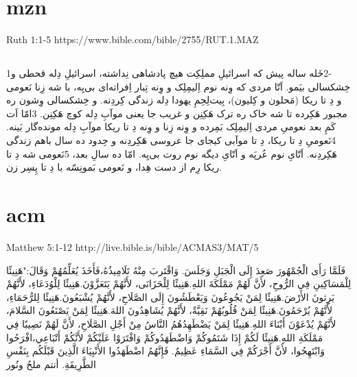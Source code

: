 \documentclass[12pt,fleqn,titlepage,twoside,a4paper]{book}
\begin{document}
\section{mzn}

Ruth 1:1-5  https://www.bible.com/bible/2755/RUT.1.MAZ

\begin{arab}[utf]
\section*{}

1‏-2خَله ساله پیش که اسرائیلِ مملِکِت هیچ پادشاهی نِداشته، اسرائیلِ دِله قحطی و خِشکسالی بیَمو. اَتّا مردی که وِنه نوم اِلیمِلِک و وِنه تِبار اِفراته‌ای بی‌یِه، با شه زِنا نَعومی و دِ تا ریکا (مَحلون و کِلیون)، بِیت‌لِحِمِ یهودا دِله زندگی کِردِنه. و خِشکسالی وِشون ره مجبور هَکِرده تا شه خاک ره ترک هَکِنِن و غریب جا یعنی موآبِ دِله کوچ هَکِنِن. 3امّا اَت کَمِ بعد نعومیِ مردی اِلیمِلِک بَمِرده و وِنه زِنا و وِنه دِ تا ریکا موآبِ دِله مونده‌گار بَینه. 4نَعومیِ دِ تا ریکا، دِ تا موآبی کیجای جا عروسی هَکِردِنه و حِدود ده سال باهم زندگی هَکِردِنه. اَتّایِ نوم عُرپَه و اَتّایِ دیگه نوم روت بی‌یِه. امّا ده سالِ بعد، 5نَعومی شه دِ تا ریکا رِم از دست هِدا، و نَعومی بَمونِسّه با دِ تا پِسِر زن.

\end{arab}


\section{acm}

Matthew 5:1-12 http://live.bible.is/bible/ACMAS3/MAT/5

\begin{arab}[utf]

فَلَمَّا رَأَى الْجُمْهُورَ صَعِدَ إِلَى الْجَبَلِ وَجَلَسَ. وَاقْتَربَ مِنْهُ تَلَامِيذُهُ،فَأَخَذَ يُعَلِّمُهُمْ وَقَالَ:"هَنِيئًا لِلْمَسَاكِينِ فِي الرُّوحِ، لأَنَّ لَهُمْ مَمْلَكَةَ اللهِ.هَنِيئًا لِلْحَزَانَى، لأَنَّهُمْ يَتَعَزَّوْنَ.هَنِيئًا لِلْوُدَعَاءِ، لأَنَّهُمْ يَرِثونَ الأَرْضَ.هَنِيئًا لِمَنْ يَجُوعُونَ وَيَعْطَشُونَ إِلَى الصَّلَاحِ، لأَنَّهُمْ يُشْبَعُونَ.هَنِيئًا لِلرُّحَمَاءِ، لأَنَّهُمْ يُرْحَمُونَ.هَنِيئًا لِمَنْ قُلُوبُهُمْ نَقِيَّةٌ، لأَنَّهُمْ يُشَاهِدُونَ اللهَ.هَنِيئًا لِمَنْ يَصْنَعُونَ السَّلامَ، لأَنَّهُمْ يُدْعَوْنَ أَبْنَاءَ اللهِ.هَنِيئًا لِمَنْ يَضْطَهِدُهُمُ النَّاسُ مِنْ أَجْلِ الصَّلَاحِ، لأَنَّ لَهُمْ نَصِيبًا فِي مَمْلَكَةِ اللهِ.هَنِيئًا لَكُمْ إِذَا شَتَمُوكُمْ وَاضْطَهَدُوكُمْ وَافْتَرَوْا عَلَيْكُمْ لأَنَّكُمْ أَتْبَاعِي،افْرَحُوا وَابْتَهِجُوا، لأَنَّ أَجْرَكُمْ فِي السَّمَاءِ عَظِيمٌ. فَإِنَّهُمُ اضْطَهَدُوا الأَنْبِيَاءَ الَّذِينَ قَبْلَكُم بِنَفْسِ الطَّرِيقَةِ. أنتم ملحُ ونُور
\end{arab}
\end{document}
